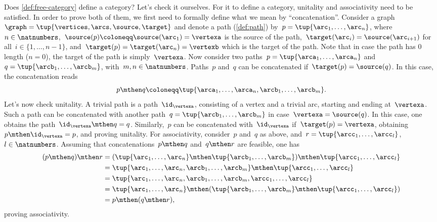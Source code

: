 Does \cref{def:free-category} define a category?
Let's check it ourselves.
For it to define a category, unitality and associativity need to be satisfied.
In order to prove both of them, we first need to formally define what we mean by ``concatenation''.
Consider a graph~$\graph=\tup{\vertices,\arcs,\source,\target}$ and denote a path (\cref{def:path}) by~$p=\tup{\arc_1,\ldots, \arc_n}$, where~$n\in \natnumbers$,~$\source(p)\coloneqq\source(\arc_1)=\vertexa$ is the source of the path,~$\target(\arc_i)=\source(\arc_{i+1})$ for all~$i\in \{1,\ldots,n-1\}$, and~$\target(p)=\target(\arc_n)=\vertexb$ which is the target of the path.
Note that in case the path has 0 length ($n=0$), the target of the path is simply~$\vertexa$.
Now consider two paths~$p=\tup{\arca_1,\ldots,\arca_n}$ and~$q=\tup{\arcb_1,\ldots,\arcb_m}$, with~$m,n\in \natnumbers$.
Paths~$p$ and~$q$ can be concatenated if~$\target(p)=\source(q)$.
In this case, the concatenation reads
%
\begin{equation*}
    p\mthen q\coloneqq \tup{\arca_1,\ldots, \arca_n,\arcb_1,\ldots,\arcb_m}.
\end{equation*}
%
Let's now check unitality.
A trivial path is a path~$\id_\vertexa$, consisting of a vertex and a trivial arc, starting and ending at~$\vertexa$.
Such a path can be concatenated with another path~$q=\tup{\arcb_1,\ldots,\arcb_m}$ in case~$\vertexa=\source(q)$.
In this case, one obtains the path~$\id_\vertexa \mthen q=q$.
Similarly,~$p$ can be concatenated with~$\id_\vertexa$ if~$\target(p)=\vertexa$, obtaining~$p\mthen \id_\vertexa=p$, and proving unitality.
For associativity, consider~$p$ and~$q$ as above, and~$r=\tup{\arcc_1,\ldots,\arcc_l}$,~$l\in \natnumbers$.
Assuming that concatenations~$p\mthen q$ and~$q\mthen r$ are feasible, one has
\begin{equation*}
    \begin{aligned}
        (p\mthen q)
        \mthen r & =(\tup{\arc_1,\ldots, \arc_n}\mthen \tup{\arcb_1,\ldots,\arcb_m})\mthen \tup{\arcc_1,\ldots,\arcc_l} \\
                 & =\tup{\arc_1,\ldots, \arc_n,\arcb_1,\ldots,\arcb_m}\mthen \tup{\arcc_1,\ldots,\arcc_l} \\
                 & = \tup{\arc_1,\ldots, \arc_n,\arcb_1,\ldots,\arcb_m, \arcc_1,\ldots,\arcc_l} \\
                 & =\tup{\arc_1,\ldots, \arc_n} \mthen (\tup{\arcb_1,\ldots,\arcb_m}\mthen \tup{\arcc_1,\ldots,\arcc_l}) \\
                 & =p\mthen (q\mthen r),
    \end{aligned}
\end{equation*}
proving associativity.

